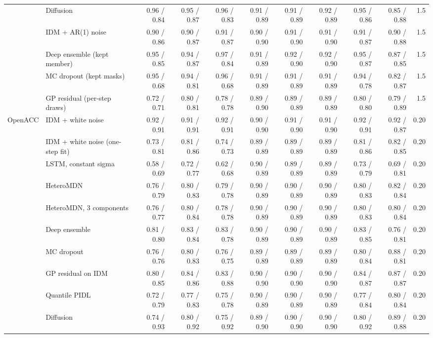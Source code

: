 \begin{longtable}{llrrrrrrrrr}
 & Diffusion & 0.96 / 0.84 & 0.95 / 0.87 & 0.96 / 0.83 & 0.91 / 0.89 & 0.91 / 0.89 & 0.92 / 0.89 & 0.95 / 0.86 & 0.85 / 0.88 & 1.5 \\
 & IDM + AR(1) noise & 0.90 / 0.86 & 0.90 / 0.87 & 0.91 / 0.87 & 0.90 / 0.90 & 0.91 / 0.90 & 0.91 / 0.90 & 0.91 / 0.87 & 0.90 / 0.88 & 1.5 \\
 & Deep ensemble (kept member) & 0.95 / 0.85 & 0.94 / 0.87 & 0.97 / 0.84 & 0.91 / 0.89 & 0.92 / 0.90 & 0.92 / 0.90 & 0.95 / 0.87 & 0.87 / 0.85 & 1.5 \\
 & MC dropout (kept masks) & 0.95 / 0.68 & 0.94 / 0.81 & 0.96 / 0.68 & 0.91 / 0.89 & 0.91 / 0.89 & 0.91 / 0.89 & 0.94 / 0.78 & 0.82 / 0.87 & 1.5 \\
 & GP residual (per-step draws) & 0.72 / 0.71 & 0.80 / 0.81 & 0.78 / 0.78 & 0.89 / 0.90 & 0.89 / 0.89 & 0.89 / 0.89 & 0.80 / 0.80 & 0.79 / 0.89 & 1.5 \\
\midrule
OpenACC & IDM + white noise & 0.92 / 0.91 & 0.91 / 0.91 & 0.92 / 0.91 & 0.90 / 0.90 & 0.91 / 0.90 & 0.91 / 0.90 & 0.92 / 0.91 & 0.92 / 0.87 & 0.20 \\
 & IDM + white noise (one-step fit) & 0.73 / 0.81 & 0.81 / 0.86 & 0.74 / 0.73 & 0.89 / 0.89 & 0.89 / 0.89 & 0.89 / 0.89 & 0.81 / 0.86 & 0.82 / 0.85 & 0.20 \\
 & LSTM, constant sigma & 0.58 / 0.69 & 0.72 / 0.77 & 0.62 / 0.68 & 0.90 / 0.89 & 0.89 / 0.89 & 0.89 / 0.89 & 0.73 / 0.79 & 0.69 / 0.81 & 0.20 \\
 & HeteroMDN & 0.76 / 0.79 & 0.80 / 0.83 & 0.79 / 0.78 & 0.90 / 0.89 & 0.90 / 0.89 & 0.90 / 0.89 & 0.80 / 0.83 & 0.82 / 0.84 & 0.20 \\
 & HeteroMDN, 3 components & 0.76 / 0.77 & 0.80 / 0.84 & 0.78 / 0.78 & 0.90 / 0.89 & 0.90 / 0.89 & 0.90 / 0.89 & 0.80 / 0.83 & 0.80 / 0.84 & 0.20 \\
 & Deep ensemble & 0.81 / 0.80 & 0.83 / 0.84 & 0.83 / 0.78 & 0.90 / 0.89 & 0.90 / 0.89 & 0.90 / 0.89 & 0.83 / 0.85 & 0.76 / 0.81 & 0.20 \\
 & MC dropout & 0.76 / 0.76 & 0.80 / 0.83 & 0.76 / 0.75 & 0.89 / 0.89 & 0.89 / 0.89 & 0.89 / 0.89 & 0.80 / 0.84 & 0.88 / 0.81 & 0.20 \\
 & GP residual on IDM & 0.80 / 0.85 & 0.84 / 0.86 & 0.83 / 0.88 & 0.90 / 0.90 & 0.90 / 0.90 & 0.90 / 0.90 & 0.84 / 0.87 & 0.87 / 0.87 & 0.20 \\
 & Quantile PIDL & 0.72 / 0.79 & 0.77 / 0.83 & 0.75 / 0.78 & 0.90 / 0.89 & 0.90 / 0.89 & 0.90 / 0.89 & 0.77 / 0.84 & 0.80 / 0.84 & 0.20 \\
 & Diffusion & 0.74 / 0.93 & 0.80 / 0.92 & 0.75 / 0.92 & 0.89 / 0.90 & 0.90 / 0.90 & 0.90 / 0.90 & 0.80 / 0.92 & 0.89 / 0.88 & 0.20 \\

\end{longtable}
